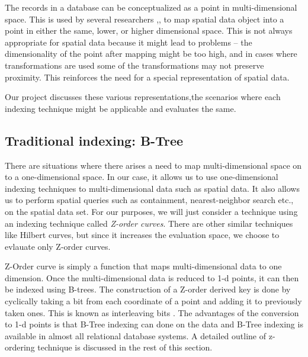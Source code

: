 \documentclass{sig-alternate-05-2015}
\begin{document}
The records in a database can be conceptualized as a point in multi-dimensional space. This is used by several researchers \cite{jagadish1990indexing},\cite{orenstein1982multidimensional}, \cite{hinrichs1983grid} to map spatial data object into a point in either the same, lower, or higher dimensional space. This is not always appropriate for spatial data because it might lead to problems -- the dimensionality of the point after mapping might be too high, and in cases where transformations are used some of the transformations may not preserve proximity. This reinforces the need for a special representation of spatial data. 

Our project discusses these various representations,the scenarios where each indexing technique might be applicable and evaluates the same.
 
\subsection{Traditional indexing: B-Tree}
There are situations where there arises a need to map multi-dimensional space on to a one-dimensional space. In our case, it allows us to use one-dimensional indexing techniques to multi-dimensional data such as spatial data. It also allows us to perform spatial queries such as containment, nearest-neighbor search etc., on the spatial data set. For our purposes, we will just consider a technique using an indexing technique called \textit{Z-order curves}. There are other similar techniques like Hilbert curves, but since it increases the evaluation space, we choose to evlauate only Z-order curves.

Z-Order curve is simply a function that maps multi-dimensional data to one dimension. Once the multi-dimensional data is reduced to 1-d points, it can then be indexed using B-trees. The construction of a Z-order derived key is done by cyclically taking a bit from each coordinate of a point and adding it to previously taken ones. This is known as interleaving bits \cite{lawder2000using}. The advantages of the conversion to 1-d points is that B-Tree indexing can done on the data and B-Tree indexing is available in almost all relational database systems.
A detailed outline of z-ordering technique is discussed in the rest of this section.
\end{document}
